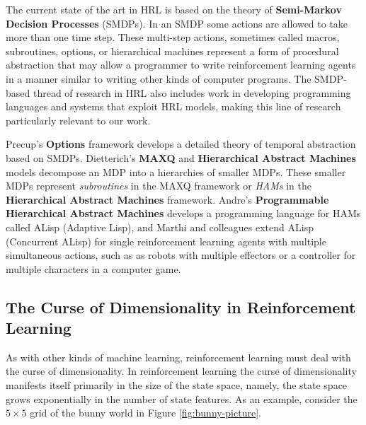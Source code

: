 The current state of the art in HRL is based on the theory of {\bf Semi-Markov Decision Processes} (SMDPs). In an SMDP some actions are allowed to take more than one time step. These multi-step actions, sometimes called macros, subroutines, options, or hierarchical machines represent a form of procedural abstraction that may allow a programmer to write reinforcement learning agents in a manner similar to writing other kinds of computer programs. The SMDP-based thread of research in HRL also includes work in developing programming languages and systems that exploit HRL models, making this line of research particularly relevant to our work.

Precup's {\bf Options} \cite{precup1998a-theoretical,sutton1999between,precup2000a-temporal} framework develops a detailed theory of temporal abstraction based on SMDPs. Dietterich's {\bf MAXQ} \cite{dietterich1998maxq,dietterich2000hierarchical} and {\bf Hierarchical Abstract Machines} \cite{parr1998reinforcement} models decompose an MDP into a hierarchies of smaller MDPs. These smaller MDPs represent {\it subroutines} in the MAXQ framework or {\it HAMs} in the {\bf Hierarchical Abstract Machines} framework. Andre's {\bf Programmable Hierarchical Abstract Machines} \cite{andre2000programmable,andre2002state} develops a programming language for HAMs called ALisp (Adaptive Lisp), and Marthi and colleagues  \cite{marthi2005concurrent} extend ALisp (Concurrent ALisp) for single reinforcement learning agents with multiple simultaneous actions, such as as robots with multiple effectors or a controller for multiple characters in a computer game.

\subsection{The Curse of Dimensionality in Reinforcement Learning}\label{sec:curse-dimensinality}

As with other kinds of machine learning, reinforcement learning must deal with the curse of dimensionality. In reinforcement learning the curse of dimensionality manifests itself primarily in the size of the state space, namely, the state space grows exponentially in the number of state features. As an example, consider the $5 \times 5$ grid of the bunny world in Figure \ref{fig:bunny-picture}.

